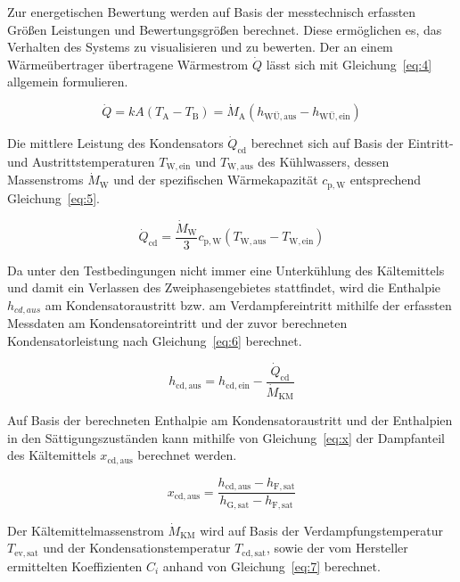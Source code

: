 Zur energetischen Bewertung werden auf Basis der messtechnisch erfassten Größen Leistungen und Bewertungsgrößen berechnet. Diese ermöglichen es, das Verhalten des Systems zu visualisieren und zu bewerten.
Der an einem Wärmeübertrager übertragene Wärmestrom  $\dot{Q}$ lässt sich mit Gleichung~\ref{eq:4} allgemein formulieren.

\begin{equation}
\label{eq:4}
\dot{Q}= kA(T_\mathrm{A} - T_\mathrm{B}) = \dot{M}_{\mathrm{A}}(h_{\mathrm{WÜ,aus}} - h_{\mathrm{WÜ,ein}})
\end{equation}

Die mittlere Leistung des Kondensators $\dot{Q}_{\mathrm{cd}}$ berechnet sich auf Basis der Eintritt- und Austrittstemperaturen $T_\mathrm{W,ein}$ und $T_\mathrm{W,aus}$ des Kühlwassers, dessen Massenstroms $\dot{M}_\mathrm{W}$ und der spezifischen Wärmekapazität $c_{\mathrm{p,W}}$ entsprechend Gleichung~\ref{eq:5}.

\begin{equation}
\label{eq:5}
\dot{Q}_{\mathrm{cd}}= \frac{\dot{M}_{\mathrm{W}}}{3} c_{\mathrm{p,W}} (T_{\mathrm{W,aus}} - T_{\mathrm{W,ein}})
\end{equation}

Da unter den Testbedingungen nicht immer eine Unterkühlung des Kältemittels und damit ein Verlassen des Zweiphasengebietes stattfindet, wird die Enthalpie $h_{cd,aus}$ am Kondensatoraustritt bzw. am Verdampfereintritt mithilfe der erfassten Messdaten am Kondensatoreintritt und der zuvor berechneten Kondensatorleistung nach Gleichung~\ref{eq:6} berechnet.

\begin{equation}
\label{eq:6}
h_{\mathrm{cd,aus}} = h_{\mathrm{cd,ein}} - \frac{\dot{Q}_{\mathrm{cd}}}{\dot{M}_{\mathrm{KM}}}
\end{equation}

Auf Basis der berechneten Enthalpie am Kondensatoraustritt und der Enthalpien in den Sättigungszuständen kann mithilfe von Gleichung~\ref{eq:x} der Dampfanteil des Kältemittels $x_{\mathrm{cd,aus}}$ berechnet werden.

\begin{equation}
\label{eq:x}
x_{\mathrm{cd,aus}} = \frac{h_{\mathrm{cd,aus}}-h_{\mathrm{F,sat}}}{h_{\mathrm{G,sat}}-h_{\mathrm{F,sat}}}
\end{equation}


Der Kältemittelmassenstrom $\dot{M}_{\mathrm{KM}}$ wird auf Basis der Verdampfungstemperatur $T_{\mathrm{ev,sat}}$  und der Kondensationstemperatur $T_{\mathrm{cd,sat}}$, sowie der vom Hersteller ermittelten Koeffizienten $C_i$ anhand von Gleichung~\ref{eq:7} berechnet.

